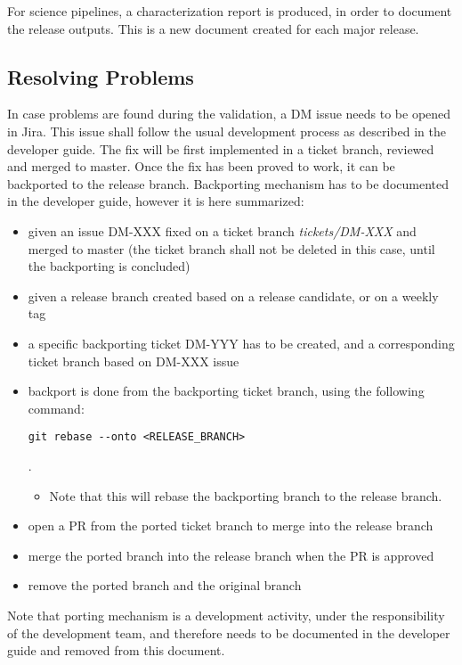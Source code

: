 For science pipelines, a characterization report is produced, in order to document the release outputs.
This is a new document created for each major release.


\subsection{Resolving Problems}

In case problems are found during the validation, a DM issue needs to be opened in Jira.
This issue shall follow the usual development process as described in the developer guide.
The fix will be first implemented in a ticket branch, reviewed and merged to master.
Once the fix has been proved to work, it can be backported to the release branch.
Backporting mechanism has to be documented in the developer guide, however it is here summarized:

\begin{itemize}
\item given an issue DM-XXX fixed on a ticket branch \textit{tickets/DM-XXX} and merged to master (the ticket branch shall not be deleted in this case, until the backporting is concluded)
\item given a release branch created based on a release candidate, or on a weekly tag
\item a specific backporting ticket DM-YYY has to be created, and a corresponding ticket branch based on DM-XXX issue
\item backport is done from the backporting ticket branch, using the following command: \begin{verbatim}git rebase --onto <RELEASE_BRANCH>\end{verbatim} .
\begin{itemize}
\item Note that this will rebase the backporting branch to the release branch.
\end{itemize}
\item open a PR from the ported ticket branch to merge into the release branch
\item merge the ported branch into the release branch when the PR is approved
\item remove the ported branch and the original branch
\end{itemize}

Note that porting mechanism is a development activity, under the responsibility of the development team, and therefore needs to be documented in the developer guide and removed from this document.

